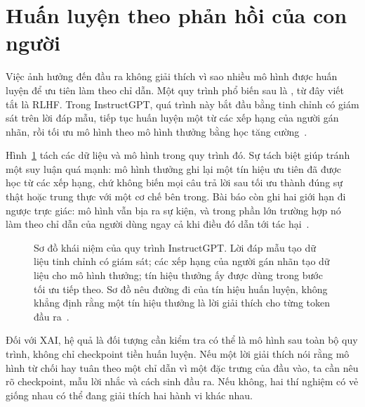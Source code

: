 \section{Huấn luyện theo phản hồi của con người}
\label{sec:ch02-huan-luyen-theo-phan-hoi}

%
Việc  ảnh hưởng đến đầu ra không giải thích vì sao nhiều
mô hình được huấn luyện để ưu tiên làm theo chỉ dẫn. Một quy trình phổ biến
sau  là
,
từ đây viết tắt là RLHF.
Trong InstructGPT, quá trình này bắt đầu bằng tinh chỉnh có giám sát trên lời
đáp mẫu, tiếp tục huấn luyện một  từ các xếp
hạng của người gán nhãn, rồi tối ưu mô hình theo mô hình thưởng bằng học tăng
cường~\autocite{p04instructgpt}.

%
Hình~\ref{fig:ch02-huan-luyen-theo-phan-hoi} tách các dữ liệu và mô hình trong
quy trình đó. Sự tách biệt giúp tránh một suy luận quá mạnh: mô hình thưởng ghi
lại một tín hiệu ưu tiên đã được học từ các xếp hạng, chứ không biến mọi câu
trả lời sau tối ưu thành đúng sự thật hoặc trung thực với một cơ chế bên trong.
Bài báo còn ghi hai giới hạn đi ngược trực giác: mô hình vẫn bịa ra sự kiện,
và trong phần lớn trường hợp nó làm theo chỉ dẫn của người dùng ngay cả khi
điều đó dẫn tới tác hại~\autocite{p04instructgpt}.

\begin{figure}[htbp]
  \centering
  
  \caption{Sơ đồ khái niệm của quy trình InstructGPT. Lời đáp mẫu tạo dữ liệu
  tinh chỉnh có giám sát; các xếp hạng của người gán nhãn tạo dữ liệu cho mô
  hình thưởng; tín hiệu thưởng ấy được dùng trong bước tối ưu tiếp theo. Sơ đồ
  nêu đường đi của tín hiệu huấn luyện, không khẳng định rằng một tín hiệu
  thưởng là lời giải thích cho từng token đầu ra~\autocite{p04instructgpt}.}
  \label{fig:ch02-huan-luyen-theo-phan-hoi}
\end{figure}

Đối với XAI, hệ quả là đối tượng cần kiểm tra có thể là mô hình sau toàn bộ
quy trình, không chỉ checkpoint tiền huấn luyện. Nếu một lời giải thích nói
rằng mô hình từ chối hay tuân theo một chỉ dẫn vì một đặc trưng của đầu vào,
ta cần nêu rõ checkpoint, mẫu lời nhắc và cách sinh đầu ra. Nếu không, hai
thí nghiệm có vẻ giống nhau có thể đang giải thích hai hành vi khác nhau.

